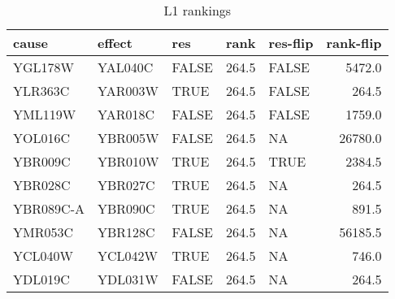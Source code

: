\begin{table}

\caption{L1 rankings  \label{tab:L1-ranks}}
\centering
\begin{tabular}[t]{lllrlr}
\toprule
cause & effect & res & rank & res-flip & rank-flip\\
\midrule
YGL178W & YAL040C & FALSE & 264.5 & FALSE & 5472.0\\
YLR363C & YAR003W & TRUE & 264.5 & FALSE & 264.5\\
YML119W & YAR018C & FALSE & 264.5 & FALSE & 1759.0\\
YOL016C & YBR005W & FALSE & 264.5 & NA & 26780.0\\
YBR009C & YBR010W & TRUE & 264.5 & TRUE & 2384.5\\
\addlinespace
YBR028C & YBR027C & TRUE & 264.5 & NA & 264.5\\
YBR089C-A & YBR090C & TRUE & 264.5 & NA & 891.5\\
YMR053C & YBR128C & FALSE & 264.5 & NA & 56185.5\\
YCL040W & YCL042W & TRUE & 264.5 & NA & 746.0\\
YDL019C & YDL031W & FALSE & 264.5 & NA & 264.5\\
\bottomrule
\end{tabular}
\end{table}
